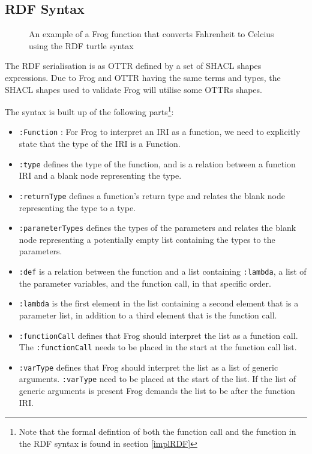 \subsection{RDF Syntax}
\label{RDF_syntax}

\begin{figure}[b]
    
    \caption{An example of a Frog function that converts Fahrenheit to Celcius using the RDF turtle syntax}
    \label{fig:rdf_example}
\end{figure}

\para
The RDF serialisation is as OTTR defined by a set of SHACL shapes expressions. Due to Frog and OTTR having the same terms and types, the SHACL shapes used to validate Frog will utilise some OTTRs shapes. 

\para
The syntax is built up of the following parts\footnote{Note that the formal defintion of both the function call and the function in the RDF syntax is found in section \ref{implRDF}}: 

\begin{itemize}
    \item \lstinline{:Function} : For Frog to interpret an IRI as a function, we need to explicitly state that the type of the IRI is a Function. 
    \item \lstinline{:type} defines the type of the function, and is a relation between a function IRI and a blank node representing the type.
    \item \lstinline{:returnType} defines a function's return type and relates the blank node representing the type to a type. 
    \item \lstinline{:parameterTypes} defines the types of the parameters and relates the blank node representing a potentially empty list containing the types to the parameters.
    \item \lstinline{:def} is a relation between the function and a list containing \lstinline{:lambda}, a list of the parameter variables, and the function call, in that specific order. 
    \item \lstinline{:lambda} is the first element in the list containing a second element that is a parameter list, in addition to a third element that is the function call. 
    \item \lstinline{:functionCall} defines that Frog should interpret the list as a function call. The \lstinline{:functionCall} needs to be placed in the start at the function call list. 
    \item \lstinline{:varType} defines that Frog should interpret the list as a list of generic arguments. \lstinline{:varType} need to be placed at the start of the list. If the list of generic arguments is present Frog demands the list to be after the function IRI. 
  
\end{itemize}


